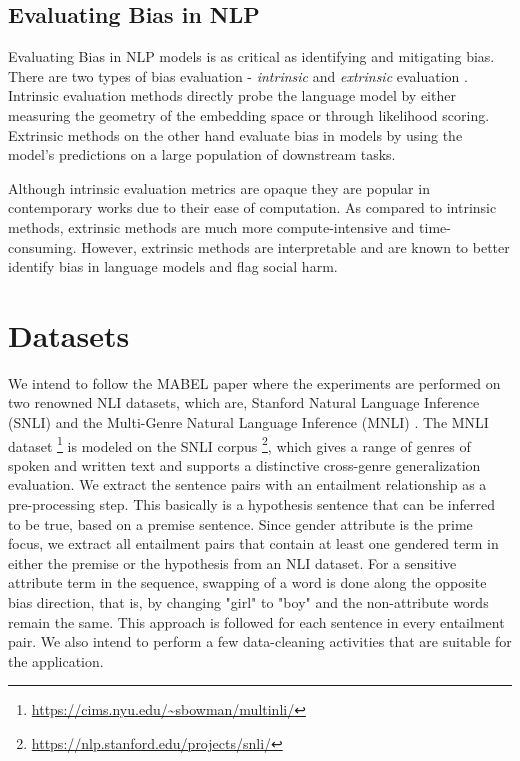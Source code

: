 \documentclass[11pt]{article}
\begin{document}
\subsection{Evaluating Bias in NLP}

Evaluating Bias in NLP models is as critical as identifying and mitigating bias. There are two types of bias evaluation - \textit{intrinsic} and \textit{extrinsic} evaluation \cite{he2022mabel}. Intrinsic evaluation methods directly probe the language model by either measuring the geometry of the embedding space or through likelihood scoring. Extrinsic methods on the other hand evaluate bias in models by using the model's predictions on a large population of downstream tasks. 

Although intrinsic evaluation metrics are opaque they are popular in contemporary works due to their ease of computation. As compared to intrinsic methods, extrinsic methods are much more compute-intensive and time-consuming. However, extrinsic methods are interpretable and are known to better identify bias in language models and flag social harm. 



\section{Datasets}

We intend to follow the MABEL paper where the experiments are performed on two renowned NLI datasets, which are, Stanford Natural Language Inference (SNLI) \cite{SNLI_dataset_paper} and the Multi-Genre Natural Language Inference (MNLI) \cite{MNLI_dataset_paper}. The MNLI dataset \footnote{\url{https://cims.nyu.edu/~sbowman/multinli/}} is modeled on the SNLI corpus \footnote{\url{https://nlp.stanford.edu/projects/snli/}}, which gives a range of genres of spoken and written text and supports a distinctive cross-genre generalization evaluation. 
We extract the sentence pairs with an entailment relationship as a pre-processing step. This basically is a hypothesis sentence that can be inferred to be true, based on a premise sentence. Since gender attribute is the prime focus, we extract all entailment pairs that contain at least one gendered term in either the premise or the hypothesis from an NLI dataset. For a sensitive attribute term in the sequence, swapping of a word is done along the opposite bias direction, that is, by changing "girl" to "boy" and the non-attribute words remain the same. This approach is followed for each sentence in every entailment pair. We also intend to perform a few data-cleaning activities that are suitable for the application.
\end{document}
